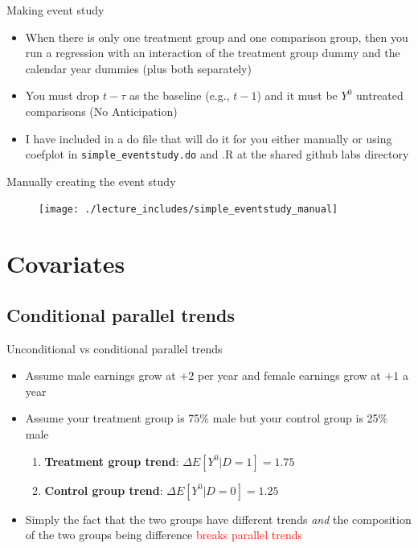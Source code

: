 \documentclass{beamer}
\begin{document}
\begin{frame}{Making event study}

\begin{itemize}
\item When there is only one treatment group and one comparison group, then you run a regression with an interaction of the treatment group dummy and the calendar year dummies (plus both separately)
\item You must drop $t-\tau$ as the baseline (e.g., $t-1$) and it must be $Y^0$ untreated comparisons (No Anticipation)
\item I have included in a do file that will do it for you either manually or using coefplot in \texttt{simple\_eventstudy.do} and .R at the shared github labs directory
\end{itemize}

\end{frame}


\begin{frame}{Manually creating the event study}

	\begin{figure}
	\texttt{[image: ./lecture\_includes/simple\_eventstudy\_manual]}
	\end{figure}

\end{frame}



\section{Covariates}

\subsection{Conditional parallel trends}

\begin{frame}{Unconditional vs conditional parallel trends}

\begin{itemize}
\item Assume male earnings grow at $+2$ per year and female earnings grow at $+1$ a year
\item Assume your treatment group is 75\% male but your control group is 25\% male
\begin{enumerate}
\item \textbf{Treatment group trend}: $\Delta E[Y^0|D=1] = 1.75$
\item \textbf{Control group trend}:  $\Delta E[Y^0|D=0] = 1.25$
\end{enumerate}
\item Simply the fact that the two groups have different trends \emph{and} the composition of the two groups being difference \textcolor{red}{breaks parallel trends}
\end{itemize}

\end{frame}
\end{document}
